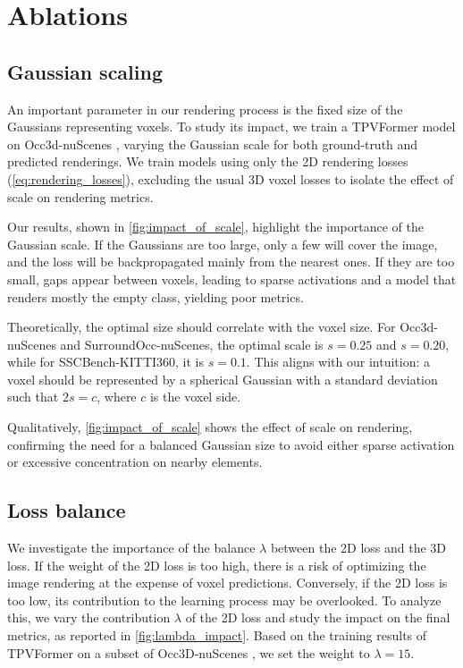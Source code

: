 

\section{Ablations}
\subsection{Gaussian scaling}

An important parameter in our rendering process is the fixed size of the Gaussians representing voxels. To study its impact, we train a TPVFormer \cite{huang2023tpv} model on Occ3d-nuScenes \cite{tian2023occ3d}, varying the Gaussian scale for both ground-truth and predicted renderings. We train models using only the 2D rendering losses (\autoref{eq:rendering_losses}), excluding the usual 3D voxel losses to isolate the effect of scale on rendering metrics.



Our results, shown in \autoref{fig:impact_of_scale}, highlight the importance of the Gaussian scale. If the Gaussians are too large, only a few will cover the image, and the loss will be backpropagated mainly from the nearest ones. If they are too small, gaps appear between voxels, leading to sparse activations and a model that renders mostly the empty class, yielding poor metrics.

Theoretically, the optimal size should correlate with the voxel size. For Occ3d-nuScenes and SurroundOcc-nuScenes, the optimal scale is $s = 0.25$ and $s = 0.20$, while for SSCBench-KITTI360, it is $s = 0.1$. This aligns with our intuition: a voxel should be represented by a spherical Gaussian with a standard deviation such that $2s = c$, where $c$ is the voxel side.

Qualitatively, \autoref{fig:impact_of_scale} shows the effect of scale on rendering, confirming the need for a balanced Gaussian size to avoid either sparse activation or excessive concentration on nearby elements.




\subsection{Loss balance}

We {investigate the importance of the balance} $\lambda$ between the 2D loss and the 3D loss. If the {weight of the} 2D loss is too high, there is a risk of optimizing the image rendering at the expense of voxel predictions. Conversely, if the 2D loss is too low, its contribution to the learning process may be {overlooked}. To analyze this, we vary the {contribution $\lambda$ of the 2D loss} and study the impact on the final metrics, {as reported in} \autoref{fig:lambda_impact}. Based on the training results of TPVFormer \cite{huang2023tpv} on a subset of Occ3D-nuScenes \cite{tian2023occ3d}, we set the weight to $\lambda=15$.


